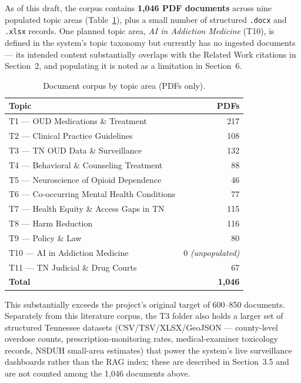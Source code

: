\documentclass[11pt]{article}
\begin{document}
As of this draft, the corpus contains \textbf{1{,}046 PDF documents} across nine populated topic areas (Table~\ref{tab:corpus}), plus a small number of structured \texttt{.docx} and \texttt{.xlsx} records. One planned topic area, \emph{AI in Addiction Medicine} (T10), is defined in the system's topic taxonomy but currently has no ingested documents --- its intended content substantially overlaps with the Related Work citations in Section~2, and populating it is noted as a limitation in Section~6.

\begin{table}[h]
\centering
\caption{Document corpus by topic area (PDFs only).}
\label{tab:corpus}
\begin{tabular}{lr}
\toprule
Topic & PDFs \\
\midrule
T1 --- OUD Medications \& Treatment & 217 \\
T2 --- Clinical Practice Guidelines & 108 \\
T3 --- TN OUD Data \& Surveillance & 132 \\
T4 --- Behavioral \& Counseling Treatment & 88 \\
T5 --- Neuroscience of Opioid Dependence & 46 \\
T6 --- Co-occurring Mental Health Conditions & 77 \\
T7 --- Health Equity \& Access Gaps in TN & 115 \\
T8 --- Harm Reduction & 116 \\
T9 --- Policy \& Law & 80 \\
T10 --- AI in Addiction Medicine & 0 \emph{(unpopulated)} \\
T11 --- TN Judicial \& Drug Courts & 67 \\
\midrule
\textbf{Total} & \textbf{1{,}046} \\
\bottomrule
\end{tabular}
\end{table}

This substantially exceeds the project's original target of 600--850 documents. Separately from this literature corpus, the T3 folder also holds a larger set of structured Tennessee datasets (CSV/TSV/XLSX/GeoJSON --- county-level overdose counts, prescription-monitoring rates, medical-examiner toxicology records, NSDUH small-area estimates) that power the system's live surveillance dashboards rather than the RAG index; these are described in Section~3.5 and are not counted among the 1{,}046 documents above.
\end{document}
